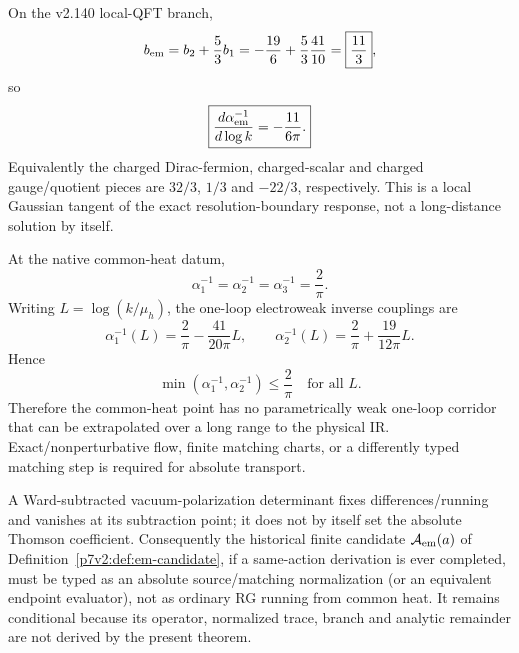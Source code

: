 \documentclass[12pt,a4paper]{article}
\begin{document}
\begin{corollary}
\label{p7v2:cor:v2141-em-one-loop-tangent}
On the v2.140 local-QFT branch,
\[
 b_{\rm em}=b_2+\frac53b_1
 =-\frac{19}{6}+\frac53\frac{41}{10}
 =\boxed{\frac{11}{3}},
\]
so
\begin{equation}
\label{p7v2:eq:v2141-em-one-loop-tangent}
 \boxed{
 \frac{d\alpha_{\rm em}^{-1}}{d\log k}=-\frac{11}{6\pi}.}
\end{equation}
Equivalently the charged Dirac-fermion, charged-scalar and charged gauge/quotient
pieces are $32/3$, $1/3$ and $-22/3$, respectively.  This is a local Gaussian
tangent of the exact resolution-boundary response, not a long-distance
solution by itself.
\end{corollary}

\begin{proposition}
\label{p7v2:prop:v2141-common-heat-strong-obstruction}
At the native common-heat datum,
\[
 \alpha_1^{-1}=\alpha_2^{-1}=\alpha_3^{-1}=\frac2\pi.
\]
Writing $L=\log(k/\mu_h)$, the one-loop electroweak inverse couplings are
\[
 \alpha_1^{-1}(L)=\frac2\pi-\frac{41}{20\pi}L,
 \qquad
 \alpha_2^{-1}(L)=\frac2\pi+\frac{19}{12\pi}L .
\]
Hence
\begin{equation}
\label{p7v2:eq:v2141-common-heat-no-weak-corridor}
 \boxed{\min(\alpha_1^{-1},\alpha_2^{-1})\le\frac2\pi\quad\text{for all }L.}
\end{equation}
Therefore the common-heat point has no parametrically weak one-loop corridor
that can be extrapolated over a long range to the physical IR.  Exact/nonperturbative
flow, finite matching charts, or a differently typed matching step is required
for absolute transport.
\end{proposition}

\begin{corollary}
\label{p7v2:cor:v2141-em-candidate-retyping}
A Ward-subtracted vacuum-polarization determinant fixes differences/running and
vanishes at its subtraction point; it does not by itself set the absolute
Thomson coefficient.  Consequently the historical finite candidate
$\mathcal A_{\rm em}(a)$ of
Definition~\ref{p7v2:def:em-candidate}, if a same-action derivation is ever
completed, must be typed as an absolute source/matching normalization (or an
equivalent endpoint evaluator), not as ordinary RG running from common heat.
It remains conditional because its operator, normalized trace, branch and
analytic remainder are not derived by the present theorem.
\end{corollary}
\end{document}
